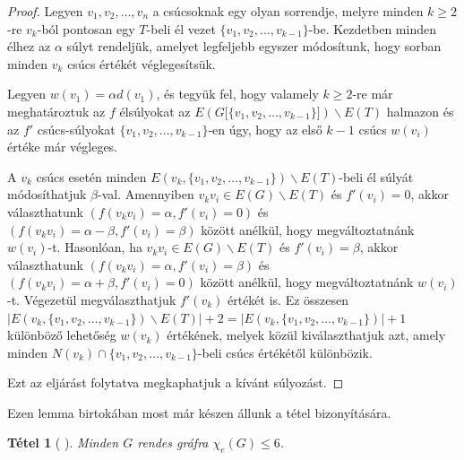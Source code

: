 \documentclass[12pt, a4paper]{report}
\newtheorem{tét}{Tétel}[section]
\theoremstyle{remark}
\theoremstyle{definition}
\begin{document}
\begin{proof}
Legyen $v_1, v_2, \ldots, v_n$ a csúcsoknak egy olyan sorrendje, melyre minden $k \geq 2$-re $v_k$-ból pontosan egy $T$-beli él vezet $\lbrace v_1, v_2, \ldots, v_{k - 1} \rbrace$-be. Kezdetben minden élhez az $\alpha$ súlyt rendeljük, amelyet legfeljebb egyszer módosítunk, hogy sorban minden $v_k$ csúcs értékét véglegesítsük.

Legyen $w(v_1) = \alpha d(v_1)$, és tegyük fel, hogy valamely $k \geq 2$-re már meghatároztuk az $f$ élsúlyokat az $E(G\lbrack \lbrace v_1, v_2, \ldots, v_{k - 1} \rbrace \rbrack) \smallsetminus E(T)$ halmazon és az $f'$ csúcs-súlyokat $\lbrace v_1, v_2, \ldots, v_{k - 1} \rbrace$-en úgy, hogy az első $k - 1$ csúcs $w(v_i)$ értéke már végleges.

A $v_k$ csúcs esetén minden $E(v_k, \lbrace v_1, v_2, \ldots, v_{k - 1} \rbrace) \smallsetminus E(T)$-beli él súlyát módosíthatjuk $\beta$-val. Amennyiben $v_k v_i \in E(G) \smallsetminus E(T)$ és $f'(v_i) = 0$, akkor választhatunk $(f(v_k v_i) = \alpha, f'(v_i) = 0)$ és $(f(v_k v_i) = \alpha - \beta, f'(v_i) = \beta)$ között anélkül, hogy megváltoztatnánk $w(v_i)$-t. Hasonlóan, ha $v_k v_i \in E(G) \smallsetminus E(T)$ és $f'(v_i) = \beta$, akkor választhatunk $(f(v_k v_i) = \alpha, f'(v_i) = \beta)$ és $(f(v_k v_i) = \alpha + \beta, f'(v_i) = 0)$ között anélkül, hogy megváltoztatnánk $w(v_i)$-t. Végezetül megválaszthatjuk $f'(v_k)$ értékét is. Ez összesen $|E(v_k, \lbrace v_1, v_2, \ldots, v_{k - 1} \rbrace) \smallsetminus E(T)| + 2 = |E(v_k, \lbrace v_1, v_2, \ldots, v_{k - 1} \rbrace)| + 1$ különböző lehetőség $w(v_k)$ értékének, melyek közül kiválaszthatjuk azt, amely minden $N(v_k) \cap \lbrace v_1, v_2, \ldots, v_{k - 1} \rbrace$-beli csúcs értékétől különbözik.

Ezt az eljárást folytatva megkaphatjuk a kívánt súlyozást.
\end{proof}

Ezen lemma birtokában most már készen állunk a tétel bizonyítására.

\begin{tét}[\citeauthor{Kalkowski2009} \cite{Kalkowski2009}]
Minden $G$ rendes gráfra $\chi_e(G) \leq 6$.
\end{tét}
\end{document}
